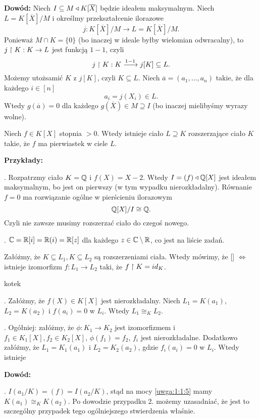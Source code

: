 \textbf{Dowód:} Niech $I\subseteq M\triangleleft K[\overline X]$ będzie ideałem maksymalnym. Niech $L=K[\overline X]/M$ i określmy przekształcenie ilorazowe
$$j:K[\overline X]/M\to L=K[\overline X]/M.$$
Ponieważ $M\cap K=\{0\}$ (bo inaczej w ideale byłby wielomian odwracalny), to $j\upharpoonright K:K\to L$ jest funkcją $1-1$, czyli
$$j\upharpoonright K:K\xrightarrow[]{1-1}j[K]\subseteq L.$$
Możemy utożsamić $K$ z $j[K]$, czyli $K\subseteq L$. Niech $\overline a=(a_1,..., a_n)$ takie, że dla każdego $i\in[n]$ 
$$a_i=j(X_i)\in L.$$
Wtedy $g(\overline a)=0$ dla każdego $g(\overline X)\in M\supseteq I$ (bo inaczej mielibyśmy wyrazy wolne).

\begin{wniosek}
    Niech $f\in K[X]$ stopnia $>0$. Wtedy istnieje ciało $L\supseteq K$ rozszerzające ciało $K$ takie, że $f$ ma pierwiastek w ciele $L$.
\end{wniosek}

\textbf{Przykłady:}

. Rozpatrzmy ciało $K=\mathbb{Q}$ i $f(X)=X-2$. Wtedy $I=(f)\triangleleft\mathbb{Q}[X]$ jest ideałem maksymalnym, bo jest on pierwszy (w tym wypadku nierozkładalny). Równanie $f=0$ ma rozwiązanie ogólne w pierścieniu ilorazowym
$$\mathbb{Q}[X]/I\cong \mathbb{Q}.$$
Czyli nie zawsze musimy rozszerzać ciało do czegoś nowego.

. $\mathbb{C}=\mathbb{R}[i]=\mathbb{R}(i)=\mathbb{R}[z]$ dla każdego $z\in\mathbb{C}\setminus\mathbb{R}$, co jest na liście zadań.
\medskip

Załóżmy, że $K\subseteq L_1, K\subseteq L_2$ są rozszerzeniami ciała. Wtedy mówimy, że  [] $\iff$ istnieje izomorfizm $f:L_1\to L_2$ taki, że $f\upharpoonright K=id_K$.

\begin{fakt}{\color{back}kotek}

. Załóżmy, że $f(X)\in K[X]$ jest nierozkładalny. Niech $L_1=K(a_1)$, $L_2=K(a_2)$ i $f(a_i)=0$ w $L_i$. Wtedy $L_1\cong_KL_2$.

. Ogółniej: załóżmy, że $\phi:K_1\to K_2$ jest izomorfizmem i $f_1\in K_1[X],f_2\in K_2[X]$, $\phi(f_1)=f_2$, $f_i$ jest nierozkładalne. Dodatkowo załóżmy, że $L_1=K_1(a_1)$ i $L_2=K_2(a_2)$, gdzie $f_i(a_i)=0$ w $L_i$. Wtedy istnieje 
\end{fakt}

\textbf{Dowód:}

. $I(a_1/K)=(f)=I(a_2/K)$, stąd na mocy \ref{uwga:1:1:5} mamy $K(a_1)\cong_KK(a_2)$. Po dowodzie przypadku 2. możemy uzasadniać, że jest to szczególny przypadek tego ogólniejszego stwierdzenia właśnie.


